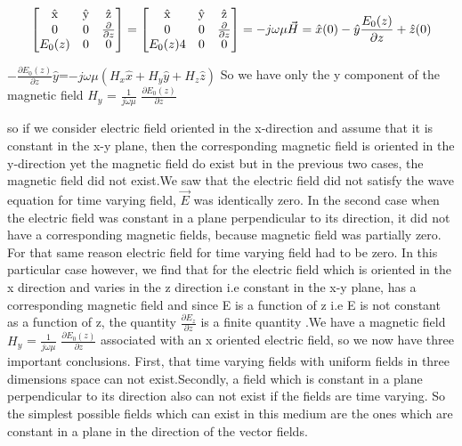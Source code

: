 			\begin{dmath*}
				\begin{bmatrix}
					$\^{x}$ & $\^{y}$ & $\^{z}$\\
					0 & 0 &  $$\frac{\partial}{\partial z}$$\\
					$$E_{0}(z)$$ & 0 & 0
				\end{bmatrix}=	
				\begin{bmatrix}
					$\^{x}$ & $\^{y}$ & $\^{z}$\\
					0 & 0 & $$\frac{\partial}{\partial z}$$\\
					$$E_{0}(z)4$$ & 0 & 0
				\end{bmatrix}=-j\omega\mu\vec{H}=\hat{x}(0) - \hat{y}\frac{E_{0}(z)}{\partial z} + \hat{z}(0)
			\end{dmath*}			
			
			\bigskip
			
			$-\frac{\partial E_{0}(z)}{\partial z}\hat{y}$=$-j\omega\mu(H_{x}\hat{x} + H_{y}\hat{y} + H_{z}\hat{z} )$
			So we have only the y component of the magnetic field $H_{y}$ = $\frac{1}{j\omega\mu}$ $\frac{\partial E_{0}(z)}{\partial z}$
			
			
			\bigskip
			
			so if we consider electric field oriented in the x-direction and assume that it is constant in the x-y plane, then the corresponding magnetic field is oriented in the y-direction yet the magnetic field do exist but in the previous two cases, the magnetic field did not exist.We saw that the electric field did not satisfy the wave equation for time varying field, $\vec{E}$ was identically zero. In the second case when the electric field was constant in a plane perpendicular to its direction, it did not have a corresponding magnetic fields, because magnetic field was partially zero. For that same reason electric field for time varying field had  to be zero.     
			In this particular case however, we find that for the electric field which is oriented in the x direction and varies in the z direction i.e constant in the x-y plane, has a corresponding magnetic field and since E is a function of z i.e E is not constant as a function of z, the quantity $\frac{\partial {E_z}}{\partial {z}}$ is a finite quantity .We have a magnetic field $H_{y}$ = $\frac{1}{j\omega\mu}$ $\frac{\partial E_{0}(z)}{\partial z}$ associated with an x oriented electric field, so we now have three important conclusions. First, that time varying fields with uniform fields in three dimensions space can not exist.Secondly, a field which is constant in a plane perpendicular to its direction also can not exist if the fields are time varying. So the simplest possible fields which can exist in this medium are the ones which are constant in a plane in the direction of the vector fields.
			

